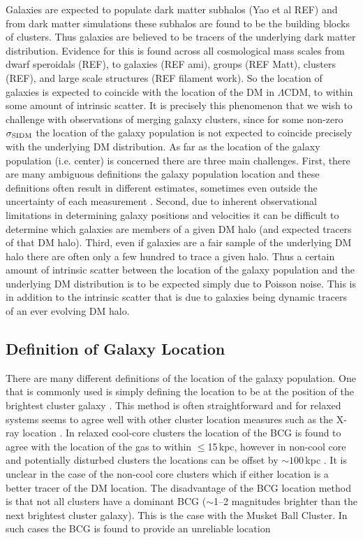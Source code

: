 Galaxies are expected to populate dark matter subhalos (Yao et al REF) and from dark matter simulations these subhalos are found to be the building blocks of clusters.
Thus galaxies are believed to be tracers of the underlying dark matter distribution.
Evidence for this is found across all cosmological mass scales from dwarf speroidals (REF), to galaxies (REF ami), groups (REF Matt), clusters (REF), and large scale structures (REF filament work).
So the location of galaxies is expected to coincide with the location of the DM in $\Lambda$CDM, to within some amount of intrinsic scatter.
It is precisely this phenomenon that we wish to challenge with observations of merging galaxy clusters, since for some non-zero $\sigma_{\rm SIDM}$ the location of the galaxy population is not expected to coincide precisely with the underlying DM distribution.
As far as the location of the galaxy population (i.e. center) is concerned there are three main challenges.
First, there are many ambiguous definitions the galaxy population location and these definitions often result in different estimates, sometimes even outside the uncertainty of each measurement \citep{George:2012uo}.
Second, due to inherent observational limitations in determining galaxy positions and velocities it can be difficult to determine which galaxies are members of a given DM halo (and expected tracers of that DM halo).
Third, even if galaxies are a fair sample of the underlying DM halo there are often only a few hundred to trace a given halo.
Thus a certain amount of intrinsic scatter between the location of the galaxy population and the underlying DM distribution is to be expected simply due to Poisson noise.
This is in addition to the intrinsic scatter that is due to galaxies being dynamic tracers of an ever evolving DM halo. 

\subsection{Definition of Galaxy Location}

There are many different definitions of the location of the galaxy population.  
One that is commonly used is simply defining the location to be at the position of the brightest cluster galaxy \citep[e.g.][]{Gladders:2000ca, Koester:2007en, Hao:2010kz}.
This method is often straightforward and for relaxed systems seems to agree well with other cluster location measures such as the X-ray location \citep{Sheldon:2001kk, Koester:2007en, Sanderson:2009hi,George:2012uo}.
In relaxed cool-core clusters the location of the BCG is found to agree with the location of the gas to within $\leq$15\,kpc, however in non-cool core and potentially disturbed clusters the locations can be offset by $\sim100$\,kpc \citep{Sanderson:2009hi}.
It is unclear in the case of the \citet{Sanderson:2009hi} non-cool core clusters which if either location is a better tracer of the DM location.
The disadvantage of the BCG location method is that not all clusters have a dominant BCG ($\sim$1--2 magnitudes brighter than the next brightest cluster galaxy).
This is the case with the Musket Ball Cluster.
In such cases the BCG is found to provide an unreliable location \citep[see e.g.][]{George:2012uo}

